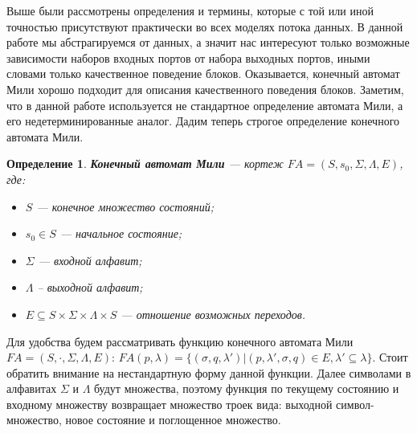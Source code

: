 \documentclass[10pt,a4paper]{article}
\newtheorem{defen}{Определение}
\newcommand{\FA}{F\!A}
\begin{document}
Выше были рассмотрены определения и термины, которые с той или иной точностью присутствуют практически во всех моделях потока данных.
В данной работе мы абстрагируемся от данных, а значит нас интересуют только возможные зависимости наборов входных портов от набора выходных портов,
иными словами только качественное поведение блоков. Оказывается, конечный автомат Мили хорошо подходит для описания качественного поведения блоков.
Заметим, что в данной работе используется не стандартное определение автомата Мили, а его недетерминированные аналог.
Дадим теперь строгое определение конечного автомата Мили.

\begin{defen}
  \textbf{Конечный автомат Мили} --- кортеж $\FA = (S, s_0, \Sigma, \Lambda, E)$, где:
  \begin{itemize}
    \item $S$ --- конечное множество состояний;
    \item $s_0 \in S$ --- начальное состояние;
    \item $\Sigma$ --- входной алфавит;
    \item $\Lambda$ -- выходной алфавит;
    \item $E \subseteq S \times \Sigma \times \Lambda \times S$ --- отношение возможных переходов.
  \end{itemize}
\end{defen}

Для удобства будем рассматривать функцию конечного автомата Мили $\FA = (S, \cdot, \Sigma, \Lambda, E)$:
$\FA(p, \lambda) = \{(\sigma, q, \lambda') \vert (p, \lambda', \sigma, q) \in E, \lambda' \subseteq \lambda\}$.
Стоит обратить внимание на нестандартную форму данной функции. Далее символами в алфавитах $\Sigma$ и $\Lambda$ будут множества, поэтому функция по текущему состоянию и входному множеству возвращает множество троек вида:
выходной символ-множество, новое состояние и поглощенное множество.
\end{document}
